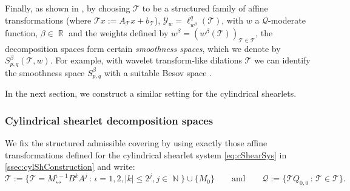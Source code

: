 \documentclass[11pt,a4paper]{article}
\numberwithin{equation}{section}
\DeclareMathOperator{\R}{\mathbb{R}}
\DeclareMathOperator{\N}{\mathbb{N}}
\newcommand{\dimFlip}{M_{\! \leftrightarrow}}
\newcommand{\mcQ}{\mathcal{Q}}  %
\newcommand{\mcT}{\mathcal{T}}  %
\newcommand{\mcY}{\mathcal{Y}}
\newcommand{\msT}{\mathscr{T}} %
\begin{document}
Finally, as shown in \cite{borup2007frame}, by choosing $\mcT$ to be a structured family of affine transformations (where $\msT x := A_\msT x + b_\msT$), $\mcY_w = \ell^q_{w^{\beta}}(\mcT)$, with $w$ a $\mcQ$-moderate function, $\beta \in \R$ and the weights defined by $w^{\beta} = \left( w^\beta(\msT) \right)_{\msT \in \mcT}$, the decomposition spaces form certain \textit{smoothness spaces}, which we denote by $S^\beta_{p,q}(\mcT, w)$. 
For example, with wavelet transform-like dilations $\mcT$ we can identify the smoothness space $S^\beta_{p,q}$ with a suitable Besov space \cite{labate13}. 

In the next section, we construct a similar setting for the cylindrical shearlets.

\subsubsection{Cylindrical shearlet decomposition spaces} \label{sssec:cylShDecompSpace}

We fix the structured admissible covering by using exactly those affine transformations defined for the cylindrical shearlet system \cref{eq:cShearSys} in \cref{ssec:cylShConstruction} and write:
$$ \mcT := \lbrace \msT = \dimFlip^{\iota-1} B^k A^j \, : \, \iota = 1,2, |k| \leq 2^j, j \in \N \rbrace \cup \lbrace M_0 \rbrace \qquad \text{and} \qquad
\mcQ := \lbrace \msT Q_{0,0} \, : \, \msT \in \mcT \rbrace. $$
\end{document}
